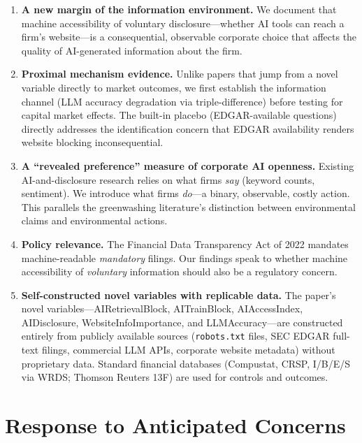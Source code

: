 \documentclass[12pt,a4paper]{article}
\begin{document}
\begin{enumerate}
    \item \textbf{A new margin of the information environment.} We document that machine accessibility of voluntary disclosure---whether AI tools can reach a firm's website---is a consequential, observable corporate choice that affects the quality of AI-generated information about the firm.

    \item \textbf{Proximal mechanism evidence.} Unlike papers that jump from a novel variable directly to market outcomes, we first establish the information channel (LLM accuracy degradation via triple-difference) before testing for capital market effects. The built-in placebo (EDGAR-available questions) directly addresses the identification concern that EDGAR availability renders website blocking inconsequential.

    \item \textbf{A ``revealed preference'' measure of corporate AI openness.} Existing AI-and-disclosure research relies on what firms \emph{say} (keyword counts, sentiment). We introduce what firms \emph{do}---a binary, observable, costly action. This parallels the greenwashing literature's distinction between environmental claims and environmental actions.

    \item \textbf{Policy relevance.} The Financial Data Transparency Act of 2022 mandates machine-readable \emph{mandatory} filings. Our findings speak to whether machine accessibility of \emph{voluntary} information should also be a regulatory concern.

    \item \textbf{Self-constructed novel variables with replicable data.} The paper's novel variables---AIRetrievalBlock, AITrainBlock, AIAccessIndex, AIDisclosure, WebsiteInfoImportance, and LLMAccuracy---are constructed entirely from publicly available sources (\texttt{robots.txt} files, SEC EDGAR full-text filings, commercial LLM APIs, corporate website metadata) without proprietary data. Standard financial databases (Compustat, CRSP, I/B/E/S via WRDS; Thomson Reuters 13F) are used for controls and outcomes.
\end{enumerate}

\section{Response to Anticipated Concerns}
\label{sec:response}
\end{document}

